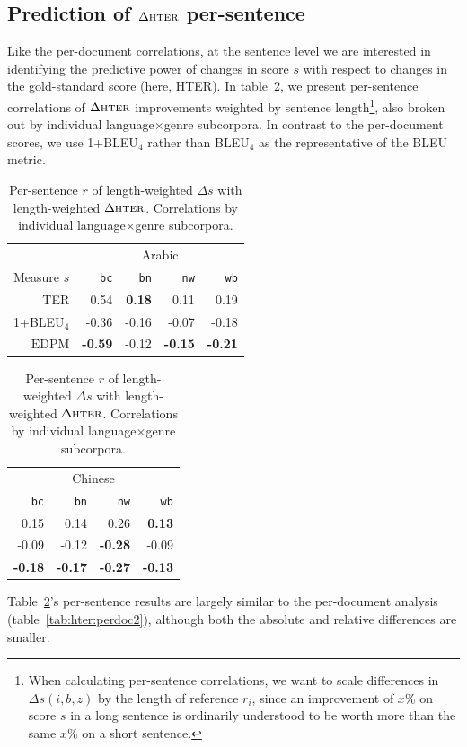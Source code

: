 \documentclass[11pt]{article}
\newcommand{\myEDPM}[0]{\ensuremath{\mathrm{EDPM}}}
\begin{document}
\subsection{Prediction of $\Delta\textsc{hter}$ per-sentence}
Like the per-document correlations, at the sentence level we are
interested in identifying the predictive power of changes in score $s$
with respect to changes in the gold-standard score (here,
\textsc{HTER}).  In table~\ref{tab:hter:persent2}, we present
per-sentence correlations of $\Delta\textsc{hter}$ improvements
weighted by sentence length\footnote{When calculating per-sentence
  correlations, we want to scale differences in $\Delta s(i,b,z)$ by
  the length of reference $r_i$, since an improvement of $x$\% on
  score $s$ in a long sentence is ordinarily understood to be worth
  more than the same $x$\% on a short sentence.}, also broken out by
individual language$\times$genre subcorpora.  In contrast to the
per-document scores, we use 1+BLEU$_4$ rather than BLEU$_4$ as the
representative of the BLEU metric.

\begin{table}
  \centering
  \begin{tabular}{r|rrrr|}
    & \multicolumn{4}{c|}{Arabic} \\
    Measure $s$& \texttt{bc} & \texttt{bn} & \texttt{nw} & \texttt{wb} \\
    \hline{}
    TER        &  0.54 & 
                  \textbf{0.18}&  0.11 &  0.19 \\
    1+BLEU$_4$   & -0.36 & -0.16 & -0.07 & -0.18 \\
    \myEDPM &
         \textbf{-0.59}& -0.12 &
                         \textbf{-0.15}&
                                 \textbf{-0.21} \\
  \end{tabular}
  \begin{tabular}{|rrrr|}
    \multicolumn{4}{|c|}{Chinese} \\
    \texttt{bc} & \texttt{bn} & \texttt{nw} & \texttt{wb} \\
    \hline{}
    0.15   &  0.14  & 0.26& 
                      \textbf{0.13} \\
    -0.09  & -0.12  &
               \textbf{-0.28} &
                             -0.09\\
    \textbf{-0.18}&
      \textbf{-0.17}&
             \textbf{-0.27}&
                      \textbf{-0.13} \\
  \end{tabular}
  \caption{Per-sentence $r$ of length-weighted $\Delta s$ with
    length-weighted $\Delta\textsc{hter}$.  Correlations by individual 
    language$\times$genre subcorpora.}
  \label{tab:hter:persent2}
\end{table}
Table~\ref{tab:hter:persent2}'s per-sentence results are largely
similar to the per-document analysis (table~\ref{tab:hter:perdoc2}),
although both the absolute and relative differences are smaller.
\end{document}
